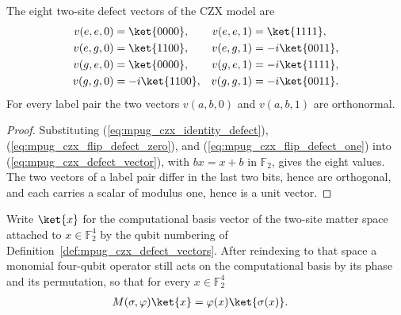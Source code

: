 \begin{lemma}
    \label{thm:mpug_czx_defect_vector_values}
    \leanok
    The eight two-site defect vectors of the CZX model are
    \begin{align}
        v(e,e,0) & =\ket{0000},   & v(e,e,1) & =\ket{1111},
        \label{eq:mpug_czx_v_ee}                              \\
        v(e,g,0) & =\ket{1100},   & v(e,g,1) & =-i\ket{0011},
        \label{eq:mpug_czx_v_eg}                              \\
        v(g,e,0) & =\ket{0000},   & v(g,e,1) & =-i\ket{1111},
        \label{eq:mpug_czx_v_ge}                              \\
        v(g,g,0) & =-i\ket{1100}, & v(g,g,1) & =-i\ket{0011}.
        \label{eq:mpug_czx_v_gg}
    \end{align}
    For every label pair the two vectors $v(a,b,0)$ and $v(a,b,1)$ are
    orthonormal.
\end{lemma}

\begin{proof}\leanok
    Substituting (\ref{eq:mpug_czx_identity_defect}),
    (\ref{eq:mpug_czx_flip_defect_zero}), and
    (\ref{eq:mpug_czx_flip_defect_one}) into
    (\ref{eq:mpug_czx_defect_vector}), with $bx=x+b$ in $\mathbb F_2$, gives
    the eight values. The two vectors of a label pair differ in the last two
    bits, hence are orthogonal, and each carries a scalar of modulus one,
    hence is a unit vector.
\end{proof}

\begin{lemma}
    \label{lem:mpug_czx_matter_monomial_action}
    \leanok
    Write $\ket{x}$ for the computational basis vector of the two-site matter
    space attached to $x\in\mathbb F_2^4$ by the qubit numbering of
    Definition~\ref{def:mpug_czx_defect_vectors}. After reindexing to that
    space a monomial four-qubit operator still acts on the computational basis
    by its phase and its permutation, so that for every $x\in\mathbb F_2^4$
    \begin{align}
        M(\sigma,\varphi)\ket{x} & =\varphi(x)\ket{\sigma(x)}.
        \label{eq:mpug_czx_matter_monomial_action}
    \end{align}
\end{lemma}


